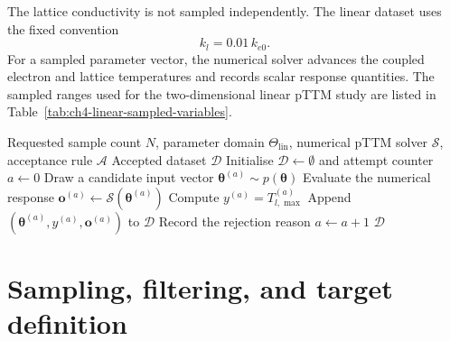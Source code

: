 The lattice conductivity is not sampled independently. The linear dataset uses the fixed convention
\begin{equation}
    k_l=0.01\,k_{e0}.
\end{equation}
For a sampled parameter vector, the numerical solver advances the coupled electron and lattice temperatures and records scalar response quantities. The sampled ranges used for the two-dimensional linear pTTM study are listed in Table~\ref{tab:ch4-linear-sampled-variables}.

\begin{table}[htbp]
    \centering
    \caption{Sampled variables for the two-dimensional linear pTTM surrogate dataset.}
    \label{tab:ch4-linear-sampled-variables}
    \small
    
\end{table}

\begin{algorithm}[htbp]
    \caption{Accepted synthetic sample generation for the linear pTTM surrogate dataset}
    \label{alg:ch4-linear-data-generation}
    \begin{algorithmic}[1]
        \Require Requested sample count $N$, parameter domain $\Theta_{\mathrm{lin}}$, numerical pTTM solver $\mathcal{S}$, acceptance rule $\mathcal{A}$
        \Ensure Accepted dataset $\mathcal{D}$
        \State Initialise $\mathcal{D}\gets\emptyset$ and attempt counter $a\gets0$
        \State Draw a candidate input vector $\boldsymbol{\theta}^{(a)}\sim p(\boldsymbol{\theta})$
        \State Evaluate the numerical response $\mathbf{o}^{(a)}\gets\mathcal{S}(\boldsymbol{\theta}^{(a)})$
        \State Compute $y^{(a)}=T_{l,\max}^{(a)}$
        \State Append $(\boldsymbol{\theta}^{(a)},y^{(a)},\mathbf{o}^{(a)})$ to $\mathcal{D}$
        \Else
        \State Record the rejection reason
        \EndIf
        \State $a\gets a+1$
        \EndWhile
        \State \Return $\mathcal{D}$
    \end{algorithmic}
\end{algorithm}

\section{Sampling, filtering, and target definition}

